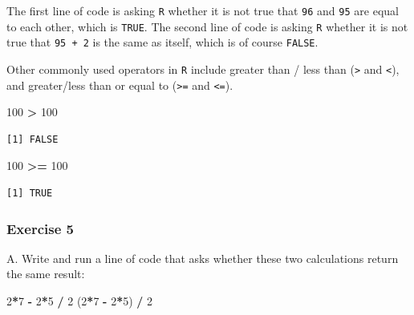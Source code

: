 \documentclass[
]{book}
\newenvironment{Shaded}{\begin{snugshade}}{\end{snugshade}}
\newcommand{\DecValTok}[1]{\textcolor[rgb]{0.00,0.00,0.81}{#1}}
\newcommand{\NormalTok}[1]{#1}
\newcommand{\OperatorTok}[1]{\textcolor[rgb]{0.81,0.36,0.00}{\textbf{#1}}}
\newcommand{\StringTok}[1]{\textcolor[rgb]{0.31,0.60,0.02}{#1}}
\begin{document}
The first line of code is asking \texttt{R} whether it is not true that \texttt{96} and \texttt{95} are equal to each other, which is \texttt{TRUE}. The second line of code is asking \texttt{R} whether it is not true that \texttt{95\ +\ 2} is the same as itself, which is of course \texttt{FALSE}.

Other commonly used operators in \texttt{R} include greater than / less than (\texttt{\textgreater{}} and \texttt{\textless{}}), and greater/less than or equal to (\texttt{\textgreater{}=} and \texttt{\textless{}=}).

\begin{Shaded}
\begin{Highlighting}[]
\DecValTok{100} \OperatorTok{>}\StringTok{ }\DecValTok{100}
\end{Highlighting}
\end{Shaded}

\begin{verbatim}
[1] FALSE
\end{verbatim}

\begin{Shaded}
\begin{Highlighting}[]
\DecValTok{100} \OperatorTok{>=}\StringTok{ }\DecValTok{100}
\end{Highlighting}
\end{Shaded}

\begin{verbatim}
[1] TRUE
\end{verbatim}

\hypertarget{exercise-5}{%
\subsubsection*{Exercise 5}\label{exercise-5}}

A. Write and run a line of code that asks whether these two calculations return the same result:

\begin{Shaded}
\begin{Highlighting}[]
\DecValTok{2}\OperatorTok{*}\DecValTok{7} \OperatorTok{-}\StringTok{ }\DecValTok{2}\OperatorTok{*}\DecValTok{5} \OperatorTok{/}\StringTok{ }\DecValTok{2}
\NormalTok{(}\DecValTok{2}\OperatorTok{*}\DecValTok{7} \OperatorTok{-}\StringTok{ }\DecValTok{2}\OperatorTok{*}\DecValTok{5}\NormalTok{) }\OperatorTok{/}\StringTok{ }\DecValTok{2}
\end{Highlighting}
\end{Shaded}
\end{document}
